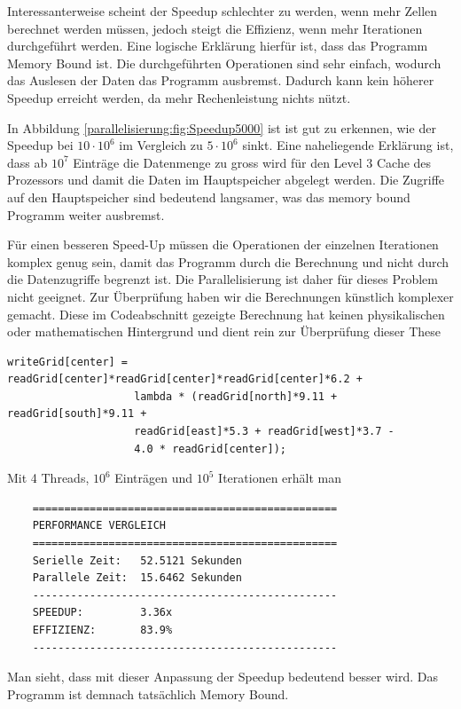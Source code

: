 Interessanterweise scheint der Speedup schlechter zu werden, wenn mehr Zellen berechnet werden müssen, jedoch steigt die Effizienz, wenn mehr Iterationen durchgeführt werden.
Eine logische Erklärung hierfür ist, dass das Programm Memory Bound ist.
Die durchgeführten Operationen sind sehr einfach, wodurch das Auslesen der Daten das Programm ausbremst.
Dadurch kann kein höherer Speedup erreicht werden, da mehr Rechenleistung nichts nützt.

In Abbildung \ref{parallelisierung:fig:Speedup5000} ist ist gut zu erkennen, wie der Speedup bei $10 \cdot 10^6$ im Vergleich zu $5 \cdot 10^6$ sinkt.
Eine naheliegende Erklärung ist, dass ab $10^7$ Einträge die Datenmenge zu gross wird für den Level 3 Cache des Prozessors und damit die Daten im Hauptspeicher abgelegt werden.
Die Zugriffe auf den Hauptspeicher sind bedeutend langsamer, was das memory bound Programm weiter ausbremst.

Für einen besseren Speed-Up müssen die Operationen der einzelnen Iterationen komplex genug sein, damit das Programm durch die Berechnung und nicht durch die Datenzugriffe begrenzt ist.
Die Parallelisierung ist daher für dieses Problem nicht geeignet.
Zur Überprüfung haben wir die Berechnungen künstlich komplexer gemacht.
Diese im Codeabschnitt gezeigte Berechnung hat keinen physikalischen oder mathematischen Hintergrund und dient rein zur Überprüfung dieser These

\begin{lstlisting}
writeGrid[center] = readGrid[center]*readGrid[center]*readGrid[center]*6.2 +
					lambda * (readGrid[north]*9.11 + readGrid[south]*9.11 +
					readGrid[east]*5.3 + readGrid[west]*3.7 -
					4.0 * readGrid[center]);	
\end{lstlisting}

Mit 4 Threads, $10^6$ Einträgen und $10^5$ Iterationen erhält man 

\begin{lstlisting}
	================================================
	PERFORMANCE VERGLEICH
	================================================
	Serielle Zeit:   52.5121 Sekunden
	Parallele Zeit:  15.6462 Sekunden
	------------------------------------------------
	SPEEDUP:         3.36x
	EFFIZIENZ:       83.9%
	------------------------------------------------
\end{lstlisting}

Man sieht, dass mit dieser Anpassung der Speedup bedeutend besser wird.
Das Programm ist demnach tatsächlich Memory Bound.
